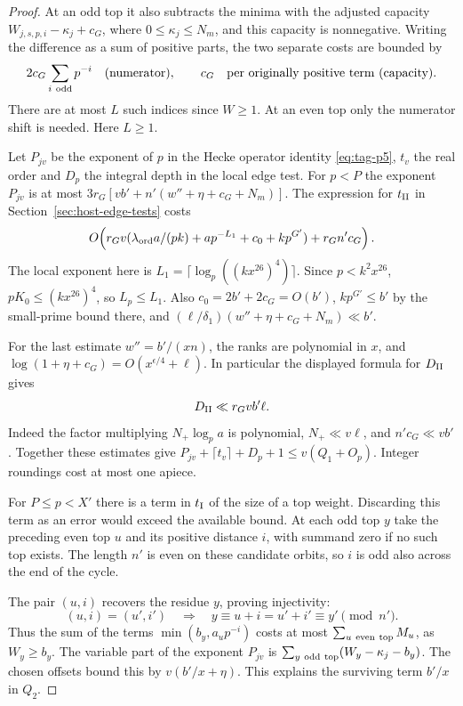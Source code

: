 \begin{proof}
At an odd top it also subtracts the minima with the adjusted
capacity \(W_{j,s,p,i}-\kappa_j+c_G\), where
\(0\le\kappa_j\le N_m\), and this capacity is nonnegative.
Writing the difference as a sum of positive parts, the two separate costs are bounded by
\[
 2c_G\sum_{i\ {\rm odd}}p^{-i}\quad\text{(numerator)},\qquad c_G\quad\text{per originally positive term (capacity)} .
\] There are at most \(L\) such indices since \(W\ge1\).
At an even top only the numerator shift is needed. Here \(L\ge1\).

Let \(P_{jv}\) be the exponent of \(p\) in the Hecke operator identity \eqref{eq:tag-p5}, \(t_v\) the real order
and \(D_p\) the integral depth in the local edge test. For \(p<P\)
the exponent \(P_{jv}\) is at most
\(3r_G[v b'+n'(w''+\eta+c_G+N_m)]\).
The expression for \(t_{\rm II}\) in Section~\ref{sec:host-edge-tests}
costs
\[
 O\!\left(r_G v
    (\lambda_{\rm ord} a/(pk)+a p^{-L_1}+c_0+k p^{G'})
                  +r_G n'c_G\right).
\]
The local exponent here is \(L_1=\lceil\log_p((kx^{26})^4)\rceil\).
Since \(p<k^2x^{26}\), \(pK_0\le(kx^{26})^4\), so \(L_p\le L_1\).
Also \(c_0=2b'+2c_G=O(b')\), \(k p^{G'}\le b'\) by the
small-prime bound there, and
\((\ell/\delta_1)(w''+\eta+c_G+N_m)\ll b'\).

For the last estimate \(w''=b'/(xn)\), the ranks are polynomial
in \(x\), and \(\log(1+\eta+c_G)=O(x^{\epsilon/4}+\ell)\).
In particular the displayed formula for \(D_{\rm II}\) gives
\[
 D_{\rm II}\ll r_G v b'\ell .
\] Indeed the factor multiplying
\(N_+\log_p a\) is polynomial, \(N_+\ll v\ell\), and
\(n'c_G\ll v b'\). Together these estimates give \(P_{jv}+\lceil t_v\rceil+D_p+1\le v(Q_1+O_p)\). Integer roundings cost at most
one apiece.

For \(P\le p<X'\) there is a term in \(t_{\rm I}\) of the size of
a top weight. Discarding this term as an error would exceed the
available bound. At each odd top \(y\) take the preceding even top
\(u\) and its positive distance \(i\), with summand zero if no
such top exists. The length \(n'\) is even on these candidate
orbits, so \(i\) is odd also across the end of the cycle.

The pair \((u,i)\) recovers the residue \(y\), proving injectivity:
\[
 (u,i)=(u',i')\quad\Longrightarrow\quad y\equiv u+i=u'+i'\equiv y'\pmod{n'} .
\]
Thus the sum of the terms \(\min(b_y,a_up^{-i})\) costs at most
\(\sum_{u\ {\rm even\ top}}M_u\), as \(W_y\ge b_y\). The variable
part of the exponent \(P_{jv}\) is
\(\sum_{y\ {\rm odd\ top}}(W_y-\kappa_j-b_y)\).
The chosen offsets bound this by \(v(b'/x+\eta)\).
This explains the surviving term \(b'/x\) in \(Q_2\).


\end{proof}
